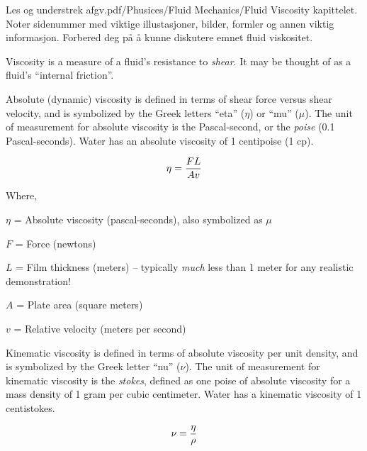 

Les og understrek afgv.pdf/Phusices/Fluid Mechanics/Fluid Viscosity  kapittelet. Noter sidenummer med viktige illustasjoner, bilder, formler og annen viktig informasjon. Forbered deg på å kunne diskutere emnet fluid viskositet. 














Viscosity is a measure of a fluid's resistance to {\it shear}.  It may be thought of as a fluid's ``internal friction''.

\vskip 10pt

Absolute (dynamic) viscosity is defined in terms of shear force versus shear velocity, and is symbolized by the Greek letters ``eta'' ($\eta$) or ``mu'' ($\mu$).  The unit of measurement for absolute viscosity is the Pascal-second, or the {\it poise} (0.1 Pascal-seconds).  Water has an absolute viscosity of 1 centipoise (1 cp).

$$\eta = {FL \over Av}$$

\noindent
Where,

$\eta$ = Absolute viscosity (pascal-seconds), also symbolized as $\mu$ 

$F$ = Force (newtons)

$L$ = Film thickness (meters) -- typically {\it much} less than 1 meter for any realistic demonstration!

$A$ = Plate area (square meters)

$v$ = Relative velocity (meters per second)

\vskip 20pt

Kinematic viscosity is defined in terms of absolute viscosity per unit density, and is symbolized by the Greek letter ``nu'' ($\nu$).  The unit of measurement for kinematic viscosity is the {\it stokes}, defined as one poise of absolute viscosity for a mass density of 1 gram per cubic centimeter.  Water has a kinematic viscosity of 1 centistokes.

$$\nu = {\eta \over \rho}$$

